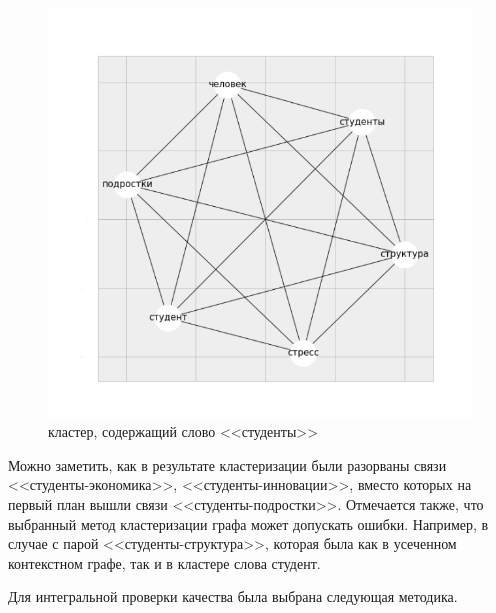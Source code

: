 \begin{figure}[ht]
  \begin{minipage}[ht]{1.0\linewidth}\centering
    \includegraphics[width=1.0\linewidth]{Dissertation/pics/students_cluster}
    \caption{кластер, содержащий слово <<студенты>>}
  \end{minipage}
  \label{img:clust_1}
\end{figure}

Можно заметить, как в результате кластеризации были разорваны связи <<студенты-экономика>>,  <<студенты-инновации>>, вместо которых на первый план вышли связи <<студенты-подростки>>. Отмечается также, что выбранный метод кластеризации графа может допускать ошибки. Например, в случае с парой <<студенты-структура>>, которая была как в усеченном контекстном графе, так и в кластере слова студент.

Для интегральной проверки качества была выбрана следующая методика.

